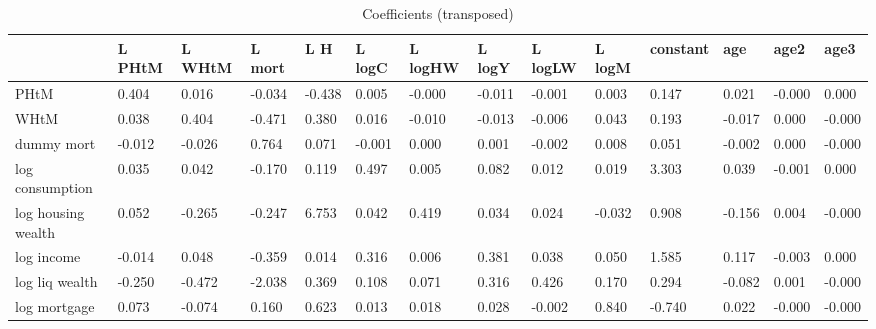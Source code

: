 \begin{table}[htbp]
\caption{\label{clabel} Coefficients (transposed)}\centering\medskip
\begin{tabular}{llllllllllllll} \hline \hline
 & L PHtM  & L WHtM  & L mort  & L H  & L logC  & L logHW  & L logY  & L logLW  & L logM  & constant  & age  & age2  & age3  \\  \hline 
PHtM &     0.404 &     0.016 &    -0.034 &    -0.438 &     0.005 &    -0.000 &    -0.011 &    -0.001 &     0.003 &     0.147 &     0.021 &    -0.000 &     0.000 \\  
WHtM &     0.038 &     0.404 &    -0.471 &     0.380 &     0.016 &    -0.010 &    -0.013 &    -0.006 &     0.043 &     0.193 &    -0.017 &     0.000 &    -0.000 \\  
dummy mort &    -0.012 &    -0.026 &     0.764 &     0.071 &    -0.001 &     0.000 &     0.001 &    -0.002 &     0.008 &     0.051 &    -0.002 &     0.000 &    -0.000 \\  
log consumption &     0.035 &     0.042 &    -0.170 &     0.119 &     0.497 &     0.005 &     0.082 &     0.012 &     0.019 &     3.303 &     0.039 &    -0.001 &     0.000 \\  
log housing wealth &     0.052 &    -0.265 &    -0.247 &     6.753 &     0.042 &     0.419 &     0.034 &     0.024 &    -0.032 &     0.908 &    -0.156 &     0.004 &    -0.000 \\  
log income &    -0.014 &     0.048 &    -0.359 &     0.014 &     0.316 &     0.006 &     0.381 &     0.038 &     0.050 &     1.585 &     0.117 &    -0.003 &     0.000 \\  
log liq wealth &    -0.250 &    -0.472 &    -2.038 &     0.369 &     0.108 &     0.071 &     0.316 &     0.426 &     0.170 &     0.294 &    -0.082 &     0.001 &    -0.000 \\  
log mortgage &     0.073 &    -0.074 &     0.160 &     0.623 &     0.013 &     0.018 &     0.028 &    -0.002 &     0.840 &    -0.740 &     0.022 &    -0.000 &    -0.000 \\  
\hline \hline \end{tabular}
\end{table}
